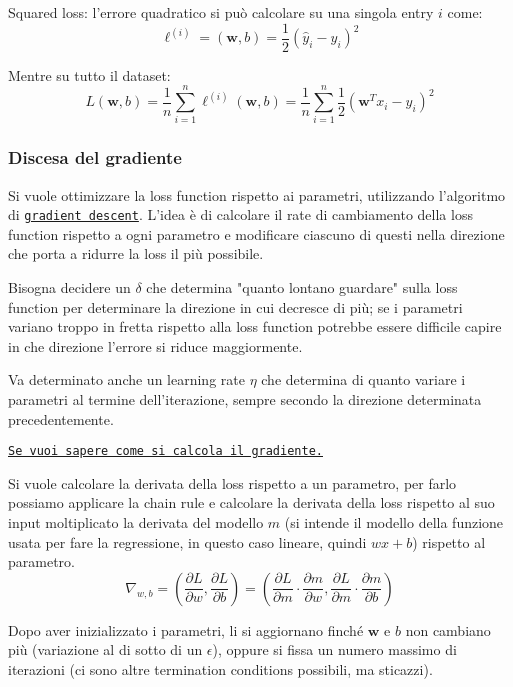 Squared loss: l'errore quadratico si può calcolare su una singola entry $i$ come:
$$ \ell^{(i)} = (\bm w, b) = \frac{1}{2}  \left(\hat y_i - y_i\right)^2 $$

Mentre su tutto il dataset:
$$ L (\bm w, b) = \frac{1}{n} \sum_{i=1}^{n} \ell^{(i)} (\bm w, b) = \frac{1}{n} \sum_{i=1}^{n} \frac{1}{2} \left(\bm w^T x_i - y_i \right)^2 $$


\subsubsection{Discesa del gradiente}

Si vuole ottimizzare la loss function rispetto ai parametri, utilizzando l'algoritmo di \href{https://it.wikipedia.org/wiki/Discesa_del_gradiente}{\texttt{gradient descent}}. L'idea è di calcolare il rate di cambiamento della loss function rispetto a ogni parametro e modificare ciascuno di questi nella direzione che porta a ridurre la loss il più possibile.

Bisogna decidere un $\delta$ che determina "quanto lontano guardare" sulla loss function per determinare la direzione in cui decresce di più; se i parametri variano troppo in fretta rispetto alla loss function potrebbe essere difficile capire in che direzione l'errore si riduce maggiormente.

Va determinato anche un learning rate $\eta$ che determina di quanto variare i parametri al termine dell'iterazione, sempre secondo la direzione determinata precedentemente.

\href{it.wikipedia.org/wiki/Gradiente}{\texttt{Se vuoi sapere come si calcola il gradiente.}}

Si vuole calcolare la derivata della loss rispetto a un parametro, per farlo possiamo applicare la chain rule e calcolare la derivata della loss rispetto al suo input moltiplicato la derivata del modello $m$ (si intende il modello della funzione usata per fare la regressione, in questo caso lineare, quindi $wx + b$) rispetto al parametro.
$$ \nabla_{w,b} = \left( \frac{\partial L}{\partial w}, \frac{\partial L}{\partial b}\right) = \left(\frac{\partial L}{\partial m} \cdot \frac{\partial m}{\partial w}, \frac{\partial L}{\partial m} \cdot \frac{\partial m}{\partial b}\right) $$

Dopo aver inizializzato i parametri, li si aggiornano finché $\bm w$ e $b$ non cambiano più (variazione al di sotto di un $\epsilon$), oppure si fissa un numero massimo di iterazioni (ci sono altre termination conditions possibili, ma sticazzi).

